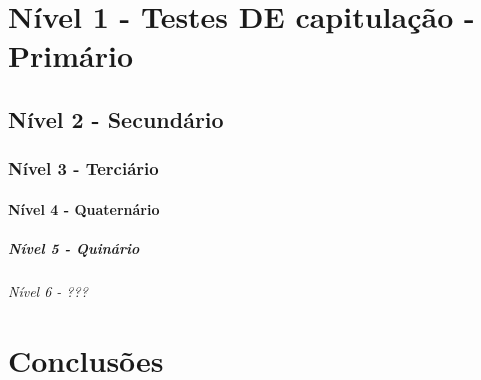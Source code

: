 \documentclass[capchap,capsec,sumarioincompleto,a4paper,12pt,ruledheader,normaltoc]{utfprtex}%
\begin{document}
\chapter{Nível 1 - Testes DE capitulação - Primário}
\section{Nível 2 - Secundário}
\subsection{Nível 3 - Terciário}
\subsubsection{Nível 4 - Quaternário}
\paragraph{Nível 5 - Quinário}
\subparagraph{Nível 6 - ???}


\chapter{Conclusões}
%
%




%

\end{document}
